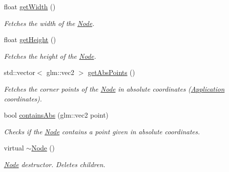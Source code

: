 \begin{DoxyCompactItemize}
float \mbox{\hyperlink{classsage_1_1Node_a65163ffabcfe9f482282ea37ead6fc5f}{get\+Width}} ()
\begin{DoxyCompactList}\small\item\em Fetches the width of the \mbox{\hyperlink{classsage_1_1Node}{Node}}. \end{DoxyCompactList}\item 
float \mbox{\hyperlink{classsage_1_1Node_a6af5a8378ac8d2c3490adbc2a03f1247}{get\+Height}} ()
\begin{DoxyCompactList}\small\item\em Fetches the height of the \mbox{\hyperlink{classsage_1_1Node}{Node}}. \end{DoxyCompactList}\item 
std\+::vector$<$ glm\+::vec2 $>$ \mbox{\hyperlink{classsage_1_1Node_af1dc65160a79ba86b10b08fd3eb28560}{get\+Abs\+Points}} ()
\begin{DoxyCompactList}\small\item\em Fetches the corner points of the \mbox{\hyperlink{classsage_1_1Node}{Node}} in absolute coordinates (\mbox{\hyperlink{classsage_1_1Application}{Application}} coordinates). \end{DoxyCompactList}\item 
bool \mbox{\hyperlink{classsage_1_1Node_a5ab70d0b3fc9a167175f7f864549db4d}{contains\+Abs}} (glm\+::vec2 point)
\begin{DoxyCompactList}\small\item\em Checks if the \mbox{\hyperlink{classsage_1_1Node}{Node}} contains a point given in absolute coordinates. \end{DoxyCompactList}\item 
virtual \mbox{\hyperlink{classsage_1_1Node_aa0840c3cb5c7159be6d992adecd2097c}{$\sim$\+Node}} ()
\begin{DoxyCompactList}\small\item\em \mbox{\hyperlink{classsage_1_1Node}{Node}} destructor. Deletes children. \end{DoxyCompactList}\end{DoxyCompactItemize}
